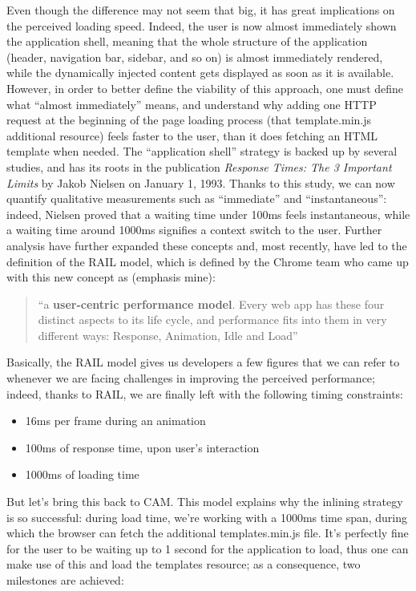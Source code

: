 \documentclass[12pt,oneside,svgnames]{memoir}
\newenvironment{quotationb}%
{\color{maincolor}\begin{leftbar}\begin{quotation}}%
{\end{quotation}\end{leftbar}\ignorespacesafterend}
\begin{document}
Even though the difference may not seem that big, it has great
implications on the perceived loading speed. Indeed, the user is now
almost immediately shown the application shell, meaning that the whole
structure of the application (header, navigation bar, sidebar, and so
on) is almost immediately rendered, while the dynamically injected
content gets displayed as soon as it is available. However, in order to
better define the viability of this approach, one must define what
``almost immediately'' means, and understand why adding one HTTP request
at the beginning of the page loading process (that template.min.js
additional resource) feels faster to the user, than it does fetching an
HTML template when needed. The ``application shell'' strategy is backed
up by several studies, and has its roots in the publication
\emph{Response Times: The 3 Important Limits} by Jakob Nielsen on
January 1, 1993. Thanks to this study, we can now quantify qualitative
measurements such as ``immediate'' and ``instantaneous'': indeed,
Nielsen proved that a waiting time under 100ms feels instantaneous,
while a waiting time around 1000ms signifies a context switch to the
user. Further analysis have further expanded these concepts and, most
recently, have led to the definition of the RAIL model, which is defined
by the Chrome team who came up with this new concept as (emphasis mine):

\begin{quotationb}
``a \textbf{user-centric performance model}. Every web app has these
four distinct aspects to its life cycle, and performance fits into them
in very different ways: Response, Animation, Idle and Load''
\end{quotationb}

Basically, the RAIL model gives us developers a few figures that we can
refer to whenever we are facing challenges in improving the perceived
performance; indeed, thanks to RAIL, we are finally left with the
following timing constraints:

\begin{itemize}
\itemsep1pt\parskip0pt
\item
  16ms per frame during an animation
\item
  100ms of response time, upon user's interaction
\item
  1000ms of loading time
\end{itemize}

But let's bring this back to CAM. This model explains why the inlining
strategy is so successful: during load time, we're working with a 1000ms
time span, during which the browser can fetch the additional
templates.min.js file. It's perfectly fine for the user to be waiting up
to 1 second for the application to load, thus one can make use of this
and load the templates resource; as a consequence, two milestones are
achieved:
\end{document}
